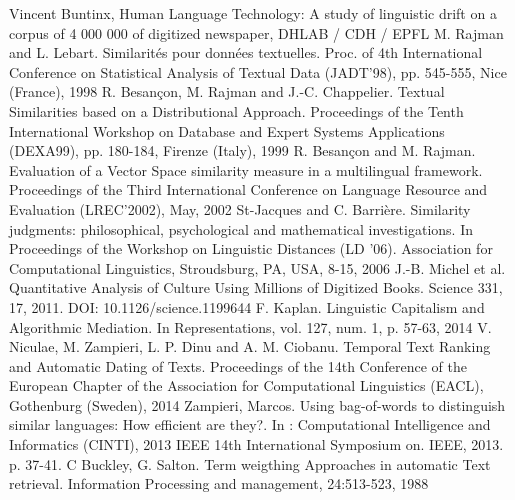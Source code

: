 \clearpage
\begin{thebibliography}{20}
\bibitem{} Vincent Buntinx, Human Language Technology: A study of linguistic drift on a corpus of 4 000 000 of digitized newspaper, DHLAB / CDH / EPFL
\bibitem{} M. Rajman and L. Lebart. Similarités pour données textuelles. Proc. of 4th International Conference on Statistical Analysis of Textual Data (JADT'98), pp. 545-555, Nice (France), 1998
\bibitem{} R. Besançon, M. Rajman and J.-C. Chappelier. Textual Similarities based on a Distributional Approach. Proceedings of the Tenth International Workshop on Database and Expert Systems Applications (DEXA99), pp. 180-184, Firenze (Italy), 1999
\bibitem{} R. Besançon and M. Rajman. Evaluation of a Vector Space similarity measure in a multilingual framework. Proceedings of the Third International Conference on Language Resource and Evaluation (LREC'2002), May, 2002
\bibitem{} St-Jacques and C. Barrière. Similarity judgments: philosophical, psychological and mathematical investigations. In Proceedings of the Workshop on Linguistic Distances (LD '06). Association for Computational Linguistics, Stroudsburg, PA, USA, 8-15, 2006
\bibitem{} J.-B. Michel et al. Quantitative Analysis of Culture Using Millions of Digitized Books. Science 331, 17, 2011. DOI: 10.1126/science.1199644
\bibitem{} F. Kaplan. Linguistic Capitalism and Algorithmic Mediation. In Representations, vol. 127, num. 1, p. 57-63, 2014
\bibitem{} V. Niculae, M. Zampieri, L. P. Dinu and A. M. Ciobanu. Temporal Text Ranking and Automatic Dating of Texts. Proceedings of the 14th Conference of the European Chapter of the Association for Computational Linguistics (EACL), Gothenburg (Sweden), 2014
\bibitem{} Zampieri, Marcos. Using bag-of-words to distinguish similar languages: How efficient are they?. In : Computational Intelligence and Informatics (CINTI), 2013 IEEE 14th International Symposium on. IEEE, 2013. p. 37-41.
\bibitem{} C Buckley, G. Salton. Term weigthing Approaches in automatic Text retrieval. Information Processing and management, 24:513-523, 1988
\end{thebibliography} 